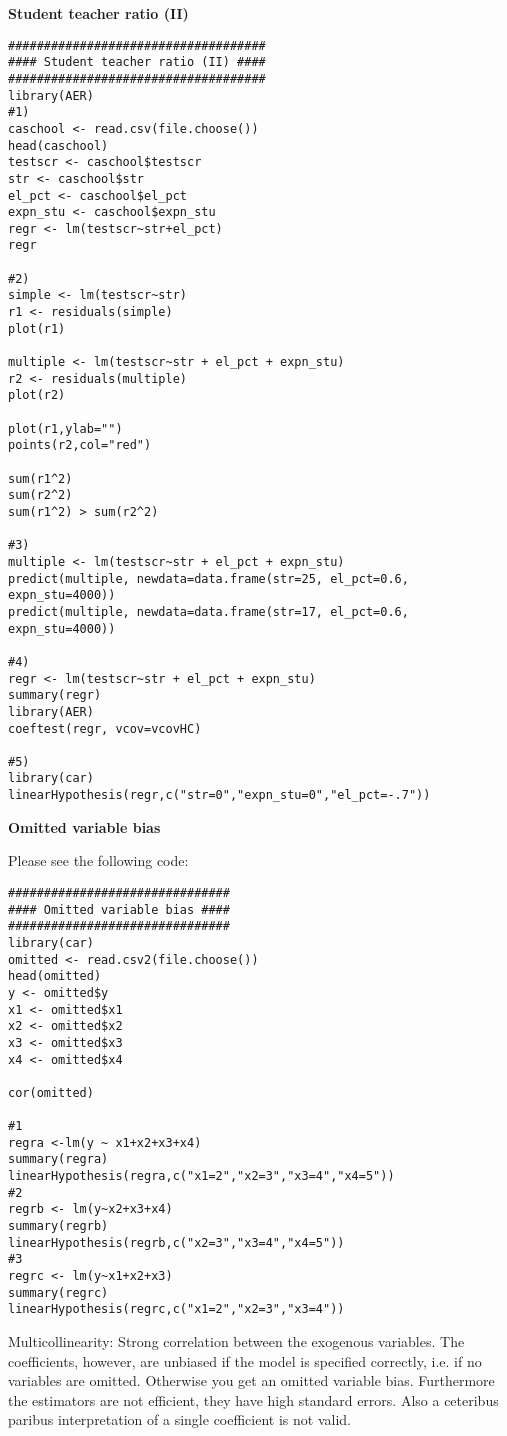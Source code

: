 \begin{Solution}{7.3}
\textbf{Student teacher ratio (II)}

\begin{verbatim}
####################################
#### Student teacher ratio (II) ####
####################################
library(AER)
#1)
caschool <- read.csv(file.choose())
head(caschool)
testscr <- caschool$testscr
str <- caschool$str
el_pct <- caschool$el_pct
expn_stu <- caschool$expn_stu
regr <- lm(testscr~str+el_pct)
regr

#2)
simple <- lm(testscr~str)
r1 <- residuals(simple)
plot(r1)

multiple <- lm(testscr~str + el_pct + expn_stu)
r2 <- residuals(multiple)
plot(r2)

plot(r1,ylab="")
points(r2,col="red")

sum(r1^2)
sum(r2^2)
sum(r1^2) > sum(r2^2)

#3)
multiple <- lm(testscr~str + el_pct + expn_stu)
predict(multiple, newdata=data.frame(str=25, el_pct=0.6, expn_stu=4000))
predict(multiple, newdata=data.frame(str=17, el_pct=0.6, expn_stu=4000))

#4)
regr <- lm(testscr~str + el_pct + expn_stu)
summary(regr)
library(AER)
coeftest(regr, vcov=vcovHC)

#5)
library(car)
linearHypothesis(regr,c("str=0","expn_stu=0","el_pct=-.7"))
\end{verbatim}
\end{Solution}
\begin{Solution}{7.4}
\textbf{Omitted variable bias}

Please see the following code:
\begin{verbatim}
###############################
#### Omitted variable bias ####
###############################
library(car)
omitted <- read.csv2(file.choose())
head(omitted)
y <- omitted$y
x1 <- omitted$x1
x2 <- omitted$x2
x3 <- omitted$x3
x4 <- omitted$x4

cor(omitted)

#1
regra <-lm(y ~ x1+x2+x3+x4)
summary(regra)
linearHypothesis(regra,c("x1=2","x2=3","x3=4","x4=5"))
#2
regrb <- lm(y~x2+x3+x4)
summary(regrb)
linearHypothesis(regrb,c("x2=3","x3=4","x4=5"))
#3
regrc <- lm(y~x1+x2+x3)
summary(regrc)
linearHypothesis(regrc,c("x1=2","x2=3","x3=4"))
\end{verbatim}

Multicollinearity: Strong correlation between the exogenous
      variables. The coefficients, however, are unbiased if the model is
      specified correctly, i.e. if no variables are omitted. Otherwise you get an omitted variable bias.
      Furthermore the estimators are not efficient, they have high standard errors. Also a ceteribus
      paribus interpretation of a single coefficient is not valid.
\end{Solution}
